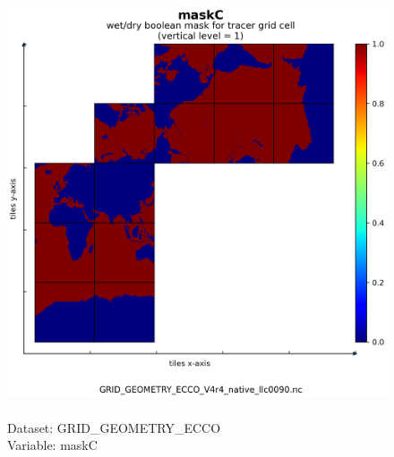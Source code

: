 \begin{figure}[H]
\centering
\includegraphics[scale=0.5]{../images/plots/native_plots_coords/Geometry_Parameters_for_the_Lat-Lon-Cap_90_(llc90)_Native_Model_Grid_(Version_4_Release_4)/maskC.png}
\caption{\\Dataset: GRID\_GEOMETRY\_ECCO\\Variable: maskC}
\label{tab:table-GRID_GEOMETRY_ECCO_maskC-Plot}
\end{figure}
\pagebreak
